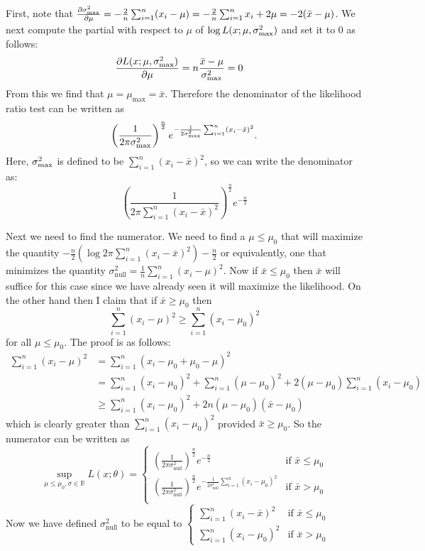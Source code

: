 \documentclass[11pt]{article} %
\begin{document}
First, note that $\frac{\partial \sigma_{\text{max}}^2}{\partial \mu}  = -\frac{2}n \sum_{i=1}^n (x_i-\mu) = -\frac{2}n \sum_{i=1}^n x_i + 2\mu = -2(\bar{x}-\mu)$. 
We next compute the partial with respect to $\mu$ of $\log L(x; \mu, \sigma_{\text{max}}^2)$ and set it to $0$ as follows:
\begin{align*}
\frac{\partial L(x;\mu,\sigma_{\text{max}}^2)}{\partial \mu}& = n \frac{\bar{x}-\mu}{\sigma_{\text{max}}^2} = 0
\end{align*}
From this we find that $\mu = \mu_{\text{max}} = \bar{x}$. Therefore the denominator of the likelihood ratio test can be written as $$\left(\frac{1}{2\pi \sigma_{\text{max}}^2}\right)^{\frac{n}2} e^{-\frac{1}{2\sigma_{\text{max}}^2}\sum_{i = 1}^n (x_i-\bar{x})^2}.$$ Here, $\sigma_{\text{max}}^2$ is defined to be $\sum_{i=1}^n (x_i-\bar{x})^2$, so we can write the denominator as: 
$$ \left(\frac{1}{2\pi \sum_{i=1}^n (x_i-\bar{x})^2}\right)^{\frac{n}2}e^{-\frac{n}2}$$

\newcommand{\sn}{\sigma_{\text{null}}}
Next we need to find the numerator. We need to find a $\mu\le \mu_0$ that will maximize the quantity $-\frac{n}2 \left(\log 2\pi \sum_{i=1}^n (x_i-\bar{x})^2 \right) -\frac{n}2$ or equivalently, one that minimizes the quantity $\sn^2 = \frac{1}n \sum_{i = 1}^n (x_i-\mu)^2$.
Now if $\bar{x}\le\mu_0$ then $\bar{x}$ will suffice for this case since we have already seen it will maximize the likelihood. On the other hand then I claim that if $\bar{x}\ge \mu_0$  then $$ \sum_{i = 1}^n (x_i-\mu)^2 \ge \sum_{i = 1}^n (x_i-\mu_0)^2$$ for all $\mu\le \mu_0$. The proof is as follows: 
\begin{align*}
\sum_{i = 1}^n (x_i-\mu)^2  & = \sum_{i = 1}^n (x_i-\mu_0 + \mu_0 - \mu)^2 \\
& = \sum_{i = 1}^n (x_i-\mu_0)^2 + \sum_{i = 1}^n (\mu-\mu_0)^2 + 2 (\mu-\mu_0)\sum_{i = 1}^n (x_i-\mu_0) \\
& \ge \sum_{i = 1}^n (x_i-\mu_0)^2 + 2 n(\mu-\mu_0) (\bar{x} - \mu_0)
\end{align*}
which is clearly greater than $ \sum_{i = 1}^n (x_i-\mu_0)^2 $ provided $\bar{x}\ge \mu_0$. So the numerator can be written as $$\sup_{\mu\le \mu_0, \sigma \in \mathbb{R}} L(x;\theta) = 
\begin{cases} 
\left(\frac{1}{2\pi \sn^2}\right)^{\frac{n}2} e^{-\frac{n}2}& \text{if $\bar{x}\le \mu_0$}\\
\left(\frac{1}{2\pi \sn^2}\right)^{\frac{n}2} e^{-\frac{1}{2\sn^2}\sum_{i = 1}^n (x_i-\mu_0)^2 }& \text{if $\bar{x}> \mu_0$}\\
\end{cases}$$ Now we have defined $\sn^2 $ to be equal to $\begin{cases}\sum_{i=1}^n (x_i - \bar{x})^2 & \text{if $\bar{x}\le \mu_0$}\\ \sum_{i=1}^n (x_i-\mu_0)^2 & \text{if $\bar{x} > \mu_0$}\end{cases}$
\end{document}
